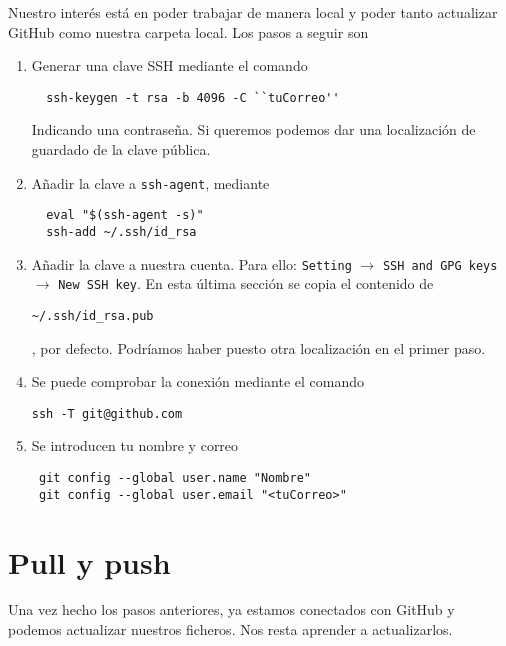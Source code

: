 Nuestro interés está en poder trabajar de manera local y poder tanto actualizar
GitHub como nuestra carpeta local. Los pasos a seguir son
\begin{enumerate}
\item Generar una clave SSH mediante el comando
\begin{verbatim}
  ssh-keygen -t rsa -b 4096 -C ``tuCorreo''
\end{verbatim}
  Indicando una contraseña. Si queremos podemos dar una localización de guardado
  de la clave pública.
\item Añadir la clave a \texttt{ssh-agent}, mediante
\begin{verbatim}
  eval "$(ssh-agent -s)"
  ssh-add ~/.ssh/id_rsa
\end{verbatim}

\item Añadir la clave a nuestra cuenta. Para ello: \texttt{Setting} $\rightarrow$
  \texttt{SSH and GPG keys} $\rightarrow$ \texttt{New SSH key}. En esta última
  sección se copia el contenido de
\begin{verbatim}
~/.ssh/id_rsa.pub
\end{verbatim}
, por defecto. Podríamos haber puesto otra localización en el primer paso.
\item Se puede comprobar la conexión mediante el comando
\begin{verbatim}
ssh -T git@github.com
\end{verbatim}
\item Se introducen tu nombre y correo
\begin{verbatim}
 git config --global user.name "Nombre"
 git config --global user.email "<tuCorreo>"
\end{verbatim}
\end{enumerate}

\section{Pull y push}

Una vez hecho los pasos anteriores, ya estamos conectados con GitHub y podemos
actualizar nuestros ficheros. Nos resta aprender a actualizarlos.

